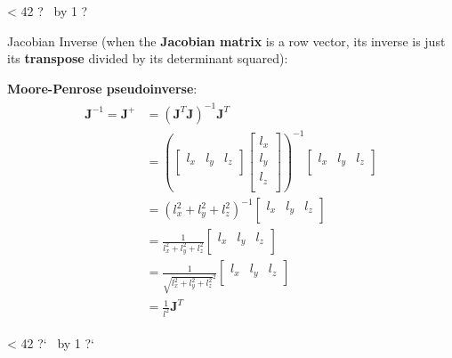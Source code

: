 \documentclass[10pt,b5paper,titlepage]{book}
\newcommand{\m}{\mathbf}
\newcommand{\repeatit}[3][10]{%
    \myloopcounter1%
    \loop\ifnum\myloopcounter < #1
    #2#3%
    \advance\myloopcounter by 1%
    \repeat%
    #2%
}
\newenvironment{qbox}
{
\begin{center}
    \repeatit[42]{?}{\ }
\end{center}
}
{
\begin{center}
    \repeatit[42]{?`}{\ }
\end{center}
}
\newenvironment{eqarray}
{
    \begin{eqnarray}
        \begin{aligned}
}
{
        \end{aligned}
    \end{eqnarray}
}
\begin{document}
\begin{qbox}

    Jacobian Inverse (when the \textbf{Jacobian matrix} is a row vector, its inverse
    is just its \textbf{transpose} divided by its determinant squared):

    \textbf{Moore-Penrose pseudoinverse}:
    \begin{eqarray}
        \boxed{\m{J}^{-1}} =
        \m{J}^{+} &= \left( \m{J}^T \m{J} \right)^{-1} \m{J}^T \\
                  &= \left(
                      \begin{bmatrix}
                          l_x & l_y & l_z \\
                      \end{bmatrix}
                      \begin{bmatrix}
                          l_x \\
                          l_y \\
                          l_z \\
                      \end{bmatrix}
                  \right)^{-1}
                      \begin{bmatrix}
                          l_x & l_y & l_z \\
                      \end{bmatrix} \\
                  &= \left( l_x^2 + l_y^2 + l_z^2 \right)^{-1}
                      \begin{bmatrix}
                          l_x & l_y & l_z \\
                      \end{bmatrix} \\
                  &= \frac{1}{l_x^2 + l_y^2 + l_z^2}
                      \begin{bmatrix}
                          l_x & l_y & l_z \\
                      \end{bmatrix} \\
                  &= \frac{1}{\sqrt{l_x^2 + l_y^2 + l_z^2}^2}
                      \begin{bmatrix}
                          l_x & l_y & l_z \\
                      \end{bmatrix} \\
                  &= \boxed{\frac{1}{l^2} \m{J}^T}
    \end{eqarray}

\end{qbox}
\end{document}
